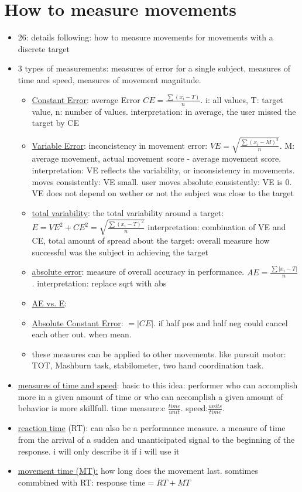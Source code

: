 \section{How to measure movements}
\begin{itemize}
	\item 26: details following: how to measure movements for movements with a discrete target
	\item 3 types of measurements: measures of error for a single subject, measures of time and speed, measures of movement magnitude.
	\begin{itemize}
		\item \underline{Constant Error}: average Error $CE=\frac{\sum(x_i-T)}{n}$. i: all values, T: target value, n: number of values. interpretation: in average, the user missed the target by CE
		\item \underline{Variable Error}: inconcistency in movement error: $VE=\sqrt{\frac{\sum(x_i-M)^2}{n}}$. M: average movement, actual movement score - average movement score. interpretation: VE reflects the variability, or inconsistency in movements. moves consistently: VE small. user moves absolute consistently: VE is 0. VE does not depend on wether or not the subject was close to the target
		\item \underline{total variability}: the total variability around a target: $E=VE^2+CE^2=\sqrt{\frac{\sum(x_i-T)^2}{n}}$
		interpretation: combination of VE and CE, total amount of spread about the target: overall measure how successful was the subject in achieving the target
		\item \underline{absolute error}: measure of overall accuracy in performance. $AE=\frac{\sum|x_i-T|}{n}$. interpretation: replace sqrt with abs
		\item \underline{AE vs. E}: \todo
		\item \underline{Absolute Constant Error}: $=|CE|$. if half pos and half neg could cancel each other out. when mean.
		\item these measures can be applied to other movements. like pursuit motor: TOT, Mashburn task, stabilometer, two hand coordination task.
	\end{itemize}
	
	\item \underline{measures of time and speed}: basic to this idea: performer who can accomplish more in a given amount of time or who can accomplish a given amount of behavior is  more skillfull. time measure:c $\frac{time}{unit}$. speed:$\frac{units}{time}$.
	\item \underline{reaction time} (RT): can also be a performance measure. a measure of time from the arrival of a sudden and unanticipated signal to the beginning of the response. 
	i will only describe it if i will use it
	\item \underline{movement time (MT):} how long does the movement last. somtimes commbined with RT: response time$=RT+MT$
	
\end{itemize}
